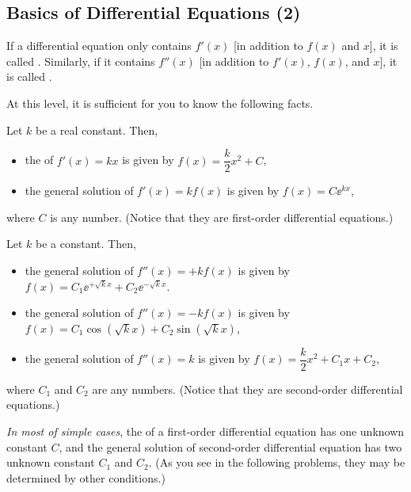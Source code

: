\documentclass[11pt,pdfa,lastpage]{MishoNote}
\begin{document}
\newpage

\subsection{Basics of Differential Equations (2)}
If a differential equation only contains $f'(x)$ [in addition to $f(x)$ and $x$], it is called .
Similarly, if it contains $f''(x)$ [in addition to $f'(x)$, $f(x)$, and $x$], it is called .

At this level, it is sufficient for you to know the following facts.
\begin{theorem}{}{}
  Let $k$ be a real constant. Then,
\begin{itemize}
  \item the  of $\displaystyle f'(x) = kx$ is given by $f(x)=\dfrac{k}{2}x^2+C$,
  \item the {general solution} of $\displaystyle f'(x) = kf(x)$ is given by $f(x)=C\ee^{kx}$,
\end{itemize}
where $C$ is any number. (Notice that they are first-order differential equations.)
\end{theorem}
\begin{theorem}{}{}
  Let $k$ be a  constant. Then,
\begin{itemize}
  \item the general solution of $\displaystyle f''(x) = +kf(x)$ is given by $f(x)=C_1\ee^{+\sqrt{k}x}+C_2\ee^{-\sqrt kx}$.
  \item the general solution of $\displaystyle f''(x) = -kf(x)$ is given by $f(x)=C_1\cos(\sqrt k x)+C_2\sin(\sqrt kx)$,
  \item the general solution of $\displaystyle f''(x) = k$ is given by $f(x)=\dfrac{k}{2}x^2+C_1x+C_2$,
\end{itemize}
where $C_1$ and $C_2$ are any numbers. (Notice that they are second-order differential equations.)
\end{theorem}
\emph{In most of simple cases}, the  of a first-order differential equation has one unknown constant $C$, and the general solution of second-order differential equation has two unknown constant $C_1$ and $C_2$.
(As you see in the following problems, they may be determined by other conditions.)


\ornamentskip
\end{document}
